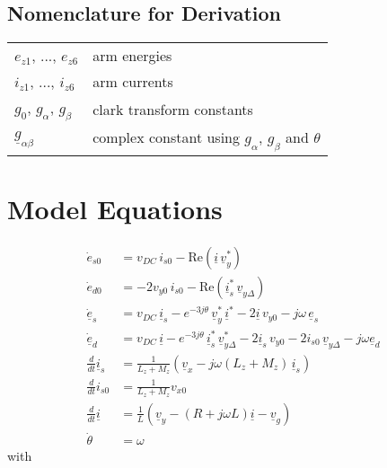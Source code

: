 \documentclass[10pt,a4paper]{article}
\begin{document}

	\subsection{Nomenclature for Derivation}
	
	\begin{tabular}{ll}
		$e_{z1}$, ..., $e_{z6}$ & arm energies\\
		$i_{z1}$, ..., $i_{z6}$ & arm currents \\
		$g_0$, $g_\alpha$, $g_\beta$ & clark transform constants \\
		$\underline{g}_{\alpha\beta}$ & complex constant using $g_\alpha$, $g_\beta$ and $\theta$ 
	\end{tabular}

		
	\section{Model Equations}
	\begin{subequations}	
	\begin{align}
		\dot{e}_{s0} &= v_{DC} \, i_{s0} - \mathrm{Re} (\underline{i}\, \underline{v}_y^*)				\\
		\dot{e}_{d0} &=-2 v_{y0}\, i_{s0} - \mathrm{Re} (\underline{i}_s^* \, \underline{v}_{y\Delta})		\\
		\dot{\underline{e}}_s &=v_{DC}\, \underline{i}_s - e^{-3j\theta}\, \underline{v}_y^* \, \underline{i}^* - 2 \underline{i}\, v_{y0} - j\omega \, \underline{e}_s 		\\
		\dot{\underline{e}}_d &= v_{DC}\, \underline{i} - e^{-3j\theta}\, \underline{i}_s^* \, \underline{v}_{y\Delta}^* - 2 \underline{i}_s \, v_{y0} - 2 i_{s0}\, \underline{v}_{y\Delta} - j\omega \underline{e}_d		 \\
		\frac{d}{dt} \underline{i}_s &= \frac{1}{L_z+M_z} (\underline{v}_x - j\omega (L_z+M_z)\, \underline{i}_s )		\\
		\frac{d}{dt} i_{s0} &= \frac{1}{L_z+M_z} v_{x0}		\\
		\frac{d}{dt}\underline{i} &= \frac{1}{L} ( \underline{v}_y - (R+j\omega L)\underline{i} - \underline{v}_g)	\\
		\dot{\theta} &= \omega
	\end{align}
	\end{subequations}
	with
	
\end{document}

